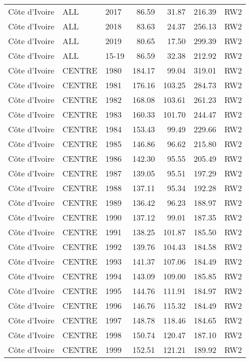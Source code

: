 \begin{longtable}{lllrrrl}
  C\^{o}te d'Ivoire & ALL & 2017 & 86.59 & 31.87 & 216.39 & RW2 \\ 
  C\^{o}te d'Ivoire & ALL & 2018 & 83.63 & 24.37 & 256.13 & RW2 \\ 
  C\^{o}te d'Ivoire & ALL & 2019 & 80.65 & 17.50 & 299.39 & RW2 \\ 
  C\^{o}te d'Ivoire & ALL & 15-19 & 86.59 & 32.38 & 212.92 & RW2 \\ 
  C\^{o}te d'Ivoire & CENTRE & 1980 & 184.17 & 99.04 & 319.01 & RW2 \\ 
  C\^{o}te d'Ivoire & CENTRE & 1981 & 176.16 & 103.25 & 284.73 & RW2 \\ 
  C\^{o}te d'Ivoire & CENTRE & 1982 & 168.08 & 103.61 & 261.23 & RW2 \\ 
  C\^{o}te d'Ivoire & CENTRE & 1983 & 160.33 & 101.70 & 244.47 & RW2 \\ 
  C\^{o}te d'Ivoire & CENTRE & 1984 & 153.43 & 99.49 & 229.66 & RW2 \\ 
  C\^{o}te d'Ivoire & CENTRE & 1985 & 146.86 & 96.62 & 215.80 & RW2 \\ 
  C\^{o}te d'Ivoire & CENTRE & 1986 & 142.30 & 95.55 & 205.49 & RW2 \\ 
  C\^{o}te d'Ivoire & CENTRE & 1987 & 139.05 & 95.51 & 197.29 & RW2 \\ 
  C\^{o}te d'Ivoire & CENTRE & 1988 & 137.11 & 95.34 & 192.28 & RW2 \\ 
  C\^{o}te d'Ivoire & CENTRE & 1989 & 136.42 & 96.23 & 188.97 & RW2 \\ 
  C\^{o}te d'Ivoire & CENTRE & 1990 & 137.12 & 99.01 & 187.35 & RW2 \\ 
  C\^{o}te d'Ivoire & CENTRE & 1991 & 138.25 & 101.87 & 185.50 & RW2 \\ 
  C\^{o}te d'Ivoire & CENTRE & 1992 & 139.76 & 104.43 & 184.58 & RW2 \\ 
  C\^{o}te d'Ivoire & CENTRE & 1993 & 141.37 & 107.06 & 184.49 & RW2 \\ 
  C\^{o}te d'Ivoire & CENTRE & 1994 & 143.09 & 109.00 & 185.85 & RW2 \\ 
  C\^{o}te d'Ivoire & CENTRE & 1995 & 144.76 & 111.91 & 184.97 & RW2 \\ 
  C\^{o}te d'Ivoire & CENTRE & 1996 & 146.76 & 115.32 & 184.49 & RW2 \\ 
  C\^{o}te d'Ivoire & CENTRE & 1997 & 148.78 & 118.46 & 184.65 & RW2 \\ 
  C\^{o}te d'Ivoire & CENTRE & 1998 & 150.74 & 120.47 & 187.10 & RW2 \\ 
  C\^{o}te d'Ivoire & CENTRE & 1999 & 152.51 & 121.21 & 189.92 & RW2 \\ 

\end{longtable}
